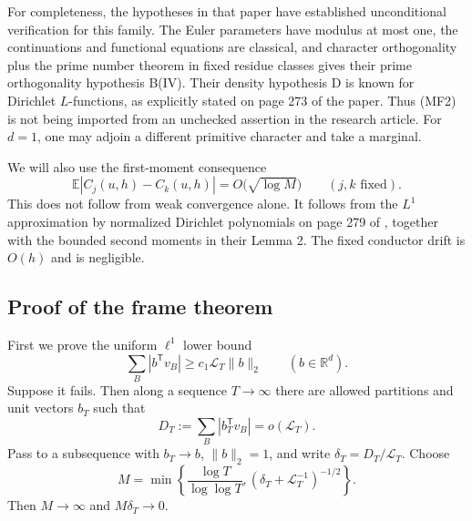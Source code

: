 For completeness, the hypotheses in that paper have established
unconditional verification for this family.  The Euler parameters have
modulus at most one, the continuations and functional equations are
classical, and character orthogonality plus the prime number theorem in
fixed residue classes gives their prime orthogonality hypothesis B(IV).
Their density hypothesis D is known for Dirichlet $L$-functions, as explicitly
stated on page 273 of the paper.  Thus (MF2) is not being imported from an
unchecked assertion in the research article.  For $d=1$, one may adjoin a
different primitive character and take a marginal.

We will also use the first-moment consequence
\[
 \mathbb E|C_j(u,h)-C_k(u,h)|=O\bigl(\sqrt{\log M}\bigr)
 \qquad(j,k\text{ fixed}).
\tag{MF3}
\]
This does not follow from weak convergence alone.  It follows from the
$L^1$ approximation by normalized Dirichlet polynomials on page 279 of
\cite{BP1998}, together with the bounded second moments in their Lemma 2.
The fixed conductor drift is $O(h)$ and is negligible.

\subsection{Proof of the frame theorem}

First we prove the uniform $\ell^1$ lower bound
\[
 \sum_B|b^{\mathsf T}v_B|\ge c_1\mathcal L_T\|b\|_2
 \qquad(b\in\mathbb R^d).
\tag{MF4}
\]
Suppose it fails.  Then along a sequence $T\to\infty$ there are allowed
partitions and unit vectors $b_T$ such that
\[
 D_T:=\sum_B|b_T^{\mathsf T}v_B|=o(\mathcal L_T).
\]
Pass to a subsequence with $b_T\to b$, $\|b\|_2=1$, and write
$\delta_T=D_T/\mathcal L_T$.  Choose
\[
 M=\min\left\{\frac{\log T}{\log\log T},
        (\delta_T+\mathcal L_T^{-1})^{-1/2}\right\}.
\]
Then $M\to\infty$ and $M\delta_T\to0$.


